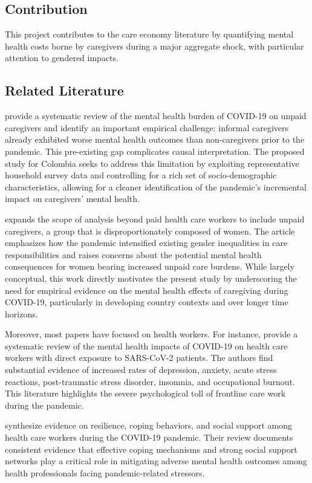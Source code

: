 \documentclass[11pt]{article}
\begin{document}
\subsection*{Contribution}
This project contributes to the care economy literature by quantifying mental health costs borne by caregivers during a major aggregate shock, with particular attention to gendered impacts.

\subsection*{Related Literature}
\cite{ervin_unpaid_2024} provide a systematic review of the mental health burden of COVID-19 on unpaid caregivers and identify an important empirical challenge: informal caregivers already exhibited worse mental health outcomes than non-caregivers prior to the pandemic. This pre-existing gap complicates causal interpretation. The proposed study for Colombia seeks to address this limitation by exploiting representative household survey data and controlling for a rich set of socio-demographic characteristics, allowing for a cleaner identification of the pandemic's incremental impact on caregivers' mental health.

\cite{power_covid-19_2020} expands the scope of analysis beyond paid health care workers to include unpaid caregivers, a group that is disproportionately composed of women. The article emphasizes how the pandemic intensified existing gender inequalities in care responsibilities and raises concerns about the potential mental health consequences for women bearing increased unpaid care burdens. While largely conceptual, this work directly motivates the present study by underscoring the need for empirical evidence on the mental health effects of caregiving during COVID-19, particularly in developing country contexts and over longer time horizons.

Moreover, most papers have focused on health workers. For instance, \cite{sanghera_impact_2020} provide a systematic review of the mental health impacts of COVID-19 on health care workers with direct exposure to SARS-CoV-2 patients. The authors find substantial evidence of increased rates of depression, anxiety, acute stress reactions, post-traumatic stress disorder, insomnia, and occupational burnout. This literature highlights the severe psychological toll of frontline care work during the pandemic.

\cite{labrague_psychological_2021} synthesize evidence on resilience, coping behaviors, and social support among health care workers during the COVID-19 pandemic. Their review documents consistent evidence that effective coping mechanisms and strong social support networks play a critical role in mitigating adverse mental health outcomes among health professionals facing pandemic-related stressors.
\end{document}
